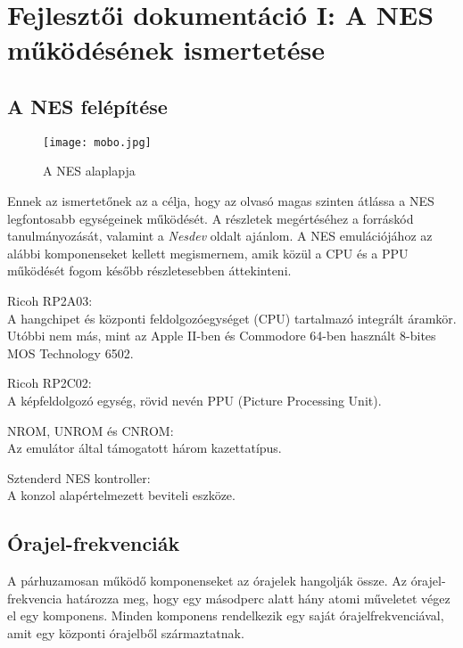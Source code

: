 \chapter{Fejlesztői dokumentáció I: A NES működésének ismertetése} %
\label{ch:impl}

\section{A NES felépítése}

\begin{figure}[H]
	\centering
	\texttt{[image: mobo.jpg]}
	\caption{A NES alaplapja}
\end{figure}

Ennek az ismertetőnek az a célja, hogy az olvasó magas szinten átlássa a NES legfontosabb egységeinek működését. A részletek megértéséhez a forráskód tanulmányozását, valamint a \emph{Nesdev} oldalt ajánlom.
A NES emulációjához az alábbi komponenseket kellett megismernem, amik közül a CPU és a PPU működését fogom később részletesebben áttekinteni.

\begin{compactdesc}
	\item[Ricoh RP2A03:] 
	\hfill \\
	A hangchipet és központi feldolgozóegységet (CPU) tartalmazó integrált áramkör. Utóbbi nem más, mint az Apple II-ben és Commodore 64-ben használt 8-bites MOS Technology 6502.
	\item[Ricoh RP2C02:]
	\hfill \\
	A képfeldolgozó egység, rövid nevén PPU (Picture Processing Unit).
	\item[NROM, UNROM és CNROM:] 
	\hfill \\
	Az emulátor által támogatott három kazettatípus.
	\item[Sztenderd NES kontroller:] 
	\hfill \\
	A konzol alapértelmezett beviteli eszköze.
\end{compactdesc}

\section{Órajel-frekvenciák}
A párhuzamosan működő komponenseket az órajelek hangolják össze. Az órajel-frekvencia határozza meg, hogy egy másodperc alatt hány atomi műveletet végez el egy komponens.
Minden komponens rendelkezik egy saját órajelfrekvenciával, amit egy központi órajelből származtatnak.

